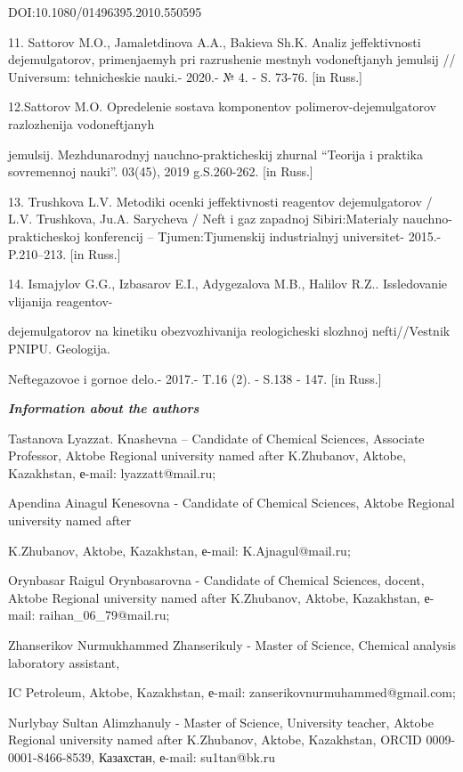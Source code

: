 \begin{noparindent}
DOI:10.1080/01496395.2010.550595

11. Sattorov M.O., Jamaletdinova A.A., Bakieva Sh.K. Analiz
jeffektivnosti dejemul\textquotesingle gatorov, primenjaemyh pri
razrushenie mestnyh vodoneftjanyh jemul\textquotesingle sij //
Universum: tehnicheskie nauki.- 2020.- № 4. - S. 73-76. {[}in Russ.{]}

12.Sattorov M.O. Opredelenie sostava komponentov
polimerov-dejemul\textquotesingle gatorov razlozhenija vodoneftjanyh

jemul\textquotesingle sij. Mezhdunarodnyj nauchno-prakticheskij zhurnal
``Teorija i praktika sovremennoj nauki''. 03(45), 2019 g.S.260-262.
{[}in Russ.{]}

13. Trushkova L.V. Metodiki ocenki jeffektivnosti reagentov
dejemul\textquotesingle gatorov / L.V. Trushkova, Ju.A. Sarycheva /
Neft\textquotesingle{} i gaz zapadnoj Sibiri:Materialy
nauchno-prakticheskoj konferencij -- Tjumen\textquotesingle:Tjumenskij
industrial\textquotesingle nyj universitet- 2015.- P.210--213. {[}in
Russ.{]}

14. Ismajylov G.G., Izbasarov E.I., Adygezalova M.B., Halilov R.Z..
Issledovanie vlijanija reagentov-

dejemul\textquotesingle gatorov na
kinetiku obezvozhivanija reologicheski slozhnoj nefti//Vestnik PNIPU.
Geologija.

Neftegazovoe i gornoe delo.- 2017.- T.16 (2). - S.138 - 147.
{[}in Russ.{]}
\end{noparindent}

\emph{{\bfseries Information about the authors}}

\begin{noparindent}
Tastanova Lyazzat. Knashevna -- Candidate of Chemical Sciences,
Associate Professor, Aktobe Regional university named after K.Zhubanov,
Aktobe, Kazakhstan, е-mail: lyazzatt@mail.ru;

Apendina Ainagul Kenesovna - Candidate of Chemical Sciences, Aktobe
Regional university named after

K.Zhubanov, Aktobe, Kazakhstan, е-mail:
K.Ajnagul@mail.ru;

Orynbasar Raigul Orynbasarovna - Candidate of Chemical Sciences, docent,
Aktobe Regional university named after K.Zhubanov, Aktobe, Kazakhstan,
е-mail: raihan\_06\_79@mail.ru;

Zhanserikov Nurmukhammed Zhanserikuly - Master of Science, Chemical
analysis laboratory assistant,

IC Petroleum, Aktobe, Kazakhstan, е-mail:
zanserikovnurmuhammed@gmail.com;

Nurlybay Sultan Alimzhanuly - Master of Science, University teacher,
Aktobe Regional university named after K.Zhubanov, Aktobe, Kazakhstan,
ORCID 0009-0001-8466-8539, Казахстан, е-mail: su1tan@bk.ru
\end{noparindent}


